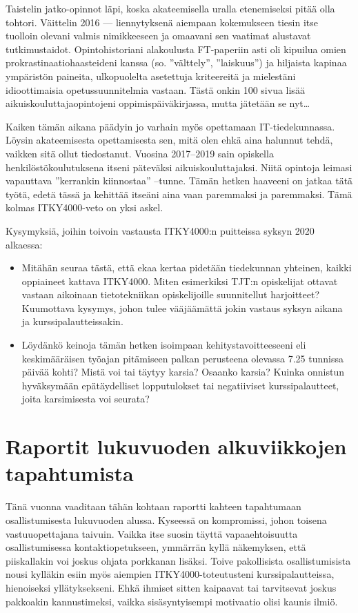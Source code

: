 \documentclass[utf8]{gradu3}
\begin{document}
Taistelin jatko-opinnot läpi, koska akateemisella uralla etenemiseksi pitää olla
tohtori. Väittelin 2016 --- liennytyksenä aiempaan kokemukseen tiesin itse
tuolloin olevani valmis nimikkeeseen ja omaavani sen vaatimat alustavat
tutkimustaidot. Opintohistoriani alakoulusta FT-paperiin asti oli kipuilua omien
prokrastinaatiohaasteideni kanssa (so. ”välttely”, ”laiskuus”) ja hiljaista
kapinaa ympäristön paineita, ulkopuolelta asetettuja kriteereitä ja mielestäni
idioottimaisia opetussuunnitelmia vastaan. Tästä onkin 100 sivua lisää
aikuiskouluttajaopintojeni oppimispäiväkirjassa, mutta jätetään se nyt\ldots

Kaiken tämän aikana päädyin jo varhain myös opettamaan IT-tiedekunnassa. Löysin
akateemisesta opettamisesta sen, mitä olen ehkä aina halunnut tehdä, vaikken
sitä ollut tiedostanut. Vuosina 2017--2019 sain opiskella henkilöstökoulutuksena
itseni päteväksi aikuiskouluttajaksi. Niitä opintoja leimasi vapauttava
”kerrankin kiinnostaa” –tunne. Tämän hetken haaveeni on jatkaa tätä työtä, edetä
tässä ja kehittää itseäni aina vaan paremmaksi ja paremmaksi. Tämä kolmas
ITKY4000-veto on yksi askel.


Kysymyksiä, joihin toivoin vastausta ITKY4000:n puitteissa syksyn 2020 alkaessa:
\begin{itemize}
\item Mitähän seuraa tästä, että ekaa kertaa pidetään tiedekunnan yhteinen,
  kaikki oppiaineet kattava ITKY4000. Miten esimerkiksi TJT:n opiskelijat
  ottavat vastaan aikoinaan tietotekniikan opiskelijoille suunnitellut
  harjoitteet? Kuumottava kysymys, johon tulee vääjäämättä jokin vastaus syksyn
  aikana ja kurssipalautteissakin.
\item  
  Löydänkö keinoja tämän hetken isoimpaan kehitystavoitteeseeni eli
  keskimääräisen työajan pitämiseen palkan perusteena olevassa 7.25 tunnissa
  päivää kohti? Mistä voi tai täytyy karsia? Osaanko karsia? Kuinka onnistun
  hyväksymään epätäydelliset lopputulokset tai negatiiviset kurssipalautteet,
  joita karsimisesta voi seurata?
\end{itemize}

\chapter{Raportit lukuvuoden alkuviikkojen tapahtumista}
\label{tapahtumaraportit}

Tänä vuonna vaaditaan tähän kohtaan raportti kahteen tapahtumaan
osallistumisesta lukuvuoden alussa. Kyseessä on kompromissi, johon toisena
vastuuopettajana taivuin. Vaikka itse suosin täyttä vapaaehtoisuutta
osallistumisessa kontaktiopetukseen, ymmärrän kyllä näkemyksen, että
piiskallakin voi joskus ohjata porkkanan lisäksi. Toive pakollisista
osallistumisista nousi kylläkin esiin myös aiempien ITKY4000-toteutusteni
kurssipalautteissa, hienoiseksi yllätyksekseni. Ehkä ihmiset sitten kaipaavat
tai tarvitsevat joskus pakkoakin kannustimeksi, vaikka sisäsyntyisempi
motivaatio olisi kaunis ilmiö.
\end{document}
